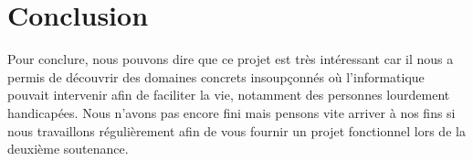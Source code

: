 \part*{Conclusion}

	Pour conclure, nous pouvons dire que ce projet est très intéressant car il nous a permis de découvrir des domaines concrets insoupçonnés où l'informatique pouvait intervenir afin de faciliter la vie, notamment des personnes lourdement handicapées. Nous n'avons pas encore fini mais pensons vite arriver à nos fins si nous travaillons régulièrement afin de vous fournir un projet fonctionnel lors de la deuxième soutenance.